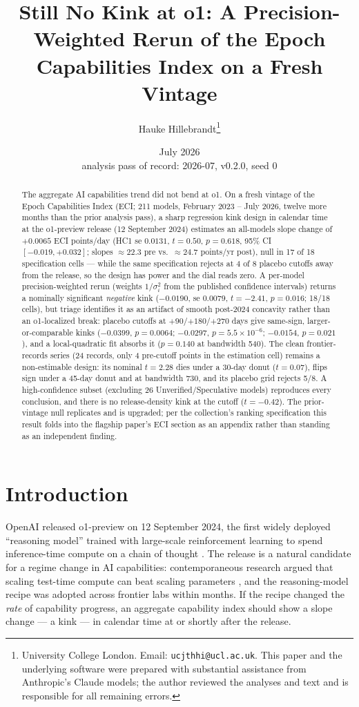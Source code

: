 \documentclass[11pt]{article}
\title{Still No Kink at o1: A Precision-Weighted Rerun of the Epoch
Capabilities Index on a Fresh Vintage}
\author{Hauke Hillebrandt\thanks{University College London. Email:
\texttt{ucjthhi@ucl.ac.uk}. This paper and the underlying \natex{} software were
prepared with substantial assistance from Anthropic's Claude models; the author
reviewed the analyses and text and is responsible for all remaining errors.}}
\date{July 2026 \\ \small analysis pass of record: 2026-07, \natex{} v0.2.0, seed 0}
\begin{document}
\maketitle

\begin{abstract}
\noindent The aggregate AI capabilities trend did not bend at o1. On a fresh
vintage of the Epoch Capabilities Index (ECI; 211 models, February 2023 --
July 2026, twelve more months than the prior analysis pass), a sharp
regression kink design in calendar time at the o1-preview release (12
September 2024) estimates an all-models slope change of $+0.0065$ ECI
points/day (HC1 se $0.0131$, $t=0.50$, $p=0.618$, 95\% CI
$[-0.019, +0.032]$; slopes $\approx22.3$ pre vs.\ $\approx24.7$ points/yr
post), null in 17 of 18 specification cells --- while the same specification
rejects at 4 of 8 placebo cutoffs away from the release, so the design has
power and the dial reads zero. A per-model precision-weighted rerun (weights
$1/\sigma_i^2$ from the published confidence intervals) returns a nominally
significant \emph{negative} kink ($-0.0190$, se $0.0079$, $t=-2.41$,
$p=0.016$; 18/18 cells), but triage identifies it as an artifact of smooth
post-2024 concavity rather than an o1-localized break: placebo cutoffs at
$+90$/$+180$/$+270$ days give same-sign, larger-or-comparable kinks
($-0.0399$, $p=0.0064$; $-0.0297$, $p=5.5\times10^{-6}$; $-0.0154$,
$p=0.021$), and a local-quadratic fit absorbs it ($p=0.140$ at bandwidth
540). The clean frontier-records series (24 records, only 4 pre-cutoff
points in the estimation cell) remains a non-estimable design: its nominal
$t=2.28$ dies under a 30-day donut ($t=0.07$), flips sign under a 45-day
donut and at bandwidth 730, and its placebo grid rejects 5/8. A
high-confidence subset (excluding 26 Unverified/Speculative models)
reproduces every conclusion, and there is no release-density kink at the
cutoff ($t=-0.42$). The prior-vintage null replicates and is upgraded; per
the collection's ranking specification this result folds into the flagship
paper's ECI section as an appendix rather than standing as an independent
finding.
\end{abstract}

\section{Introduction}\label{sec:intro}

OpenAI released o1-preview on 12 September 2024, the first widely deployed
``reasoning model'' trained with large-scale reinforcement learning to spend
inference-time compute on a chain of thought \cite{openai2024}. The release
is a natural candidate for a regime change in AI capabilities: contemporaneous
research argued that scaling test-time compute can beat scaling parameters
\cite{snell2024}, and the reasoning-model recipe was adopted across frontier
labs within months. If the recipe changed the \emph{rate} of capability
progress, an aggregate capability index should show a slope change --- a kink
--- in calendar time at or shortly after the release.
\end{document}
